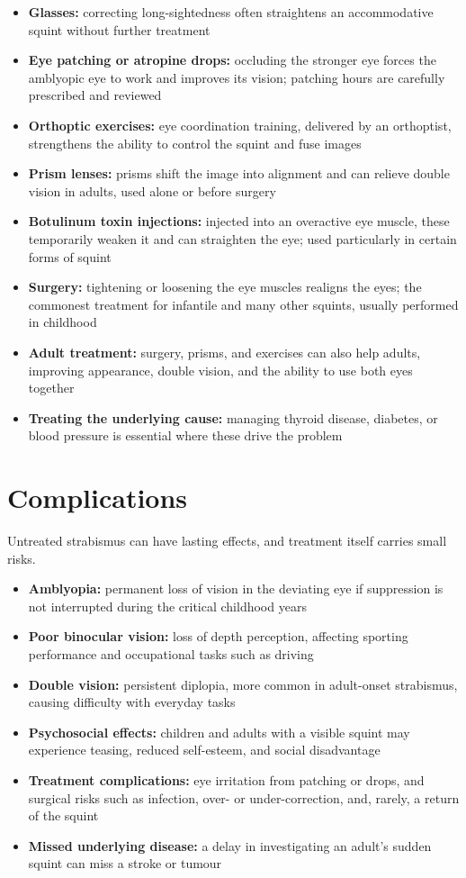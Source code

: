 \begin{itemize}
    \item \textbf{Glasses:} correcting long-sightedness often straightens an accommodative squint without further treatment
    \item \textbf{Eye patching or atropine drops:} occluding the stronger eye forces the amblyopic eye to work and improves its vision; patching hours are carefully prescribed and reviewed
    \item \textbf{Orthoptic exercises:} eye coordination training, delivered by an orthoptist, strengthens the ability to control the squint and fuse images
    \item \textbf{Prism lenses:} prisms shift the image into alignment and can relieve double vision in adults, used alone or before surgery
    \item \textbf{Botulinum toxin injections:} injected into an overactive eye muscle, these temporarily weaken it and can straighten the eye; used particularly in certain forms of squint
    \item \textbf{Surgery:} tightening or loosening the eye muscles realigns the eyes; the commonest treatment for infantile and many other squints, usually performed in childhood
    \item \textbf{Adult treatment:} surgery, prisms, and exercises can also help adults, improving appearance, double vision, and the ability to use both eyes together
    \item \textbf{Treating the underlying cause:} managing thyroid disease, diabetes, or blood pressure is essential where these drive the problem
\end{itemize}

\section*{Complications}
Untreated strabismus can have lasting effects, and treatment itself carries small risks.

\begin{itemize}
    \item \textbf{Amblyopia:} permanent loss of vision in the deviating eye if suppression is not interrupted during the critical childhood years
    \item \textbf{Poor binocular vision:} loss of depth perception, affecting sporting performance and occupational tasks such as driving
    \item \textbf{Double vision:} persistent diplopia, more common in adult-onset strabismus, causing difficulty with everyday tasks
    \item \textbf{Psychosocial effects:} children and adults with a visible squint may experience teasing, reduced self-esteem, and social disadvantage
    \item \textbf{Treatment complications:} eye irritation from patching or drops, and surgical risks such as infection, over- or under-correction, and, rarely, a return of the squint
    \item \textbf{Missed underlying disease:} a delay in investigating an adult's sudden squint can miss a stroke or tumour
\end{itemize}

